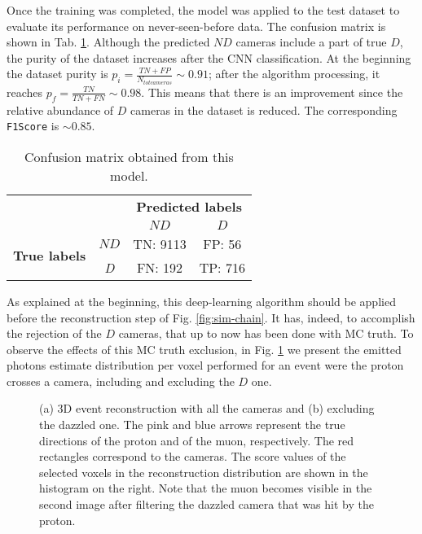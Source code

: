 Once the training was completed, the model was applied to the test dataset to evaluate its performance on never-seen-before data. The confusion matrix is shown in Tab. \ref{tab:conf-matrix}. Although the predicted $ND$ cameras include a part of true $D$, the purity of the dataset increases after the CNN classification. At the beginning the dataset purity is $p_i = \frac{TN + FP}{N_{tot cameras}} \sim 0.91$; after the algorithm processing, it reaches $p_f = \frac{TN}{TN+FN} \sim 0.98$. This means that there is an improvement since the relative abundance of $D$ cameras in the dataset is reduced. The corresponding \texttt{F1Score} is $\sim 0.85$.

\begin{table}[h!]
    \centering
    \begin{tabular}{cc|cc|}
    \cline{3-4}
    &   & \multicolumn{2}{c|}{\textbf{Predicted labels}} \\ %
    &   & \multicolumn{1}{c|}{\small{$ND$}}       & \small{$D$}  \\ \hline
    \multicolumn{1}{|c}{\multirow{2}{*}{\textbf{True labels}}} & \small{$ND$} & \multicolumn{1}{c|}{TN: 9113} & FP: 56 \\ 
    \cline{2-4} 
    \multicolumn{1}{|c}{} & \textit{\small{D}} & \multicolumn{1}{c|}{FN: 192} & TP: 716\\ 
    \hline
    \end{tabular}
    \caption{Confusion matrix obtained from this model.}
    \label{tab:conf-matrix}
\end{table}

As explained at the beginning, this deep-learning algorithm should be applied before the reconstruction step of Fig. \ref{fig:sim-chain}. It has, indeed, to accomplish the rejection of the $D$ cameras, that up to now has been done with MC truth. To observe the effects of this MC truth exclusion, in Fig. \ref{fig:ev-comparison} we present the emitted photons estimate distribution per voxel performed for an event were the proton crosses a camera, including and excluding the $D$ one.

\begin{figure}[h!]
    \centering
    \caption{(a) 3D event reconstruction with all the cameras and (b) excluding the dazzled one. The pink and blue arrows represent the true directions of the proton and of the muon, respectively. The red rectangles correspond to the cameras. The score values of the selected voxels in the reconstruction distribution are shown in the histogram on the right. Note that the muon becomes visible in the second image after filtering the dazzled camera that was hit by the proton.}
    \label{fig:ev-comparison}
\end{figure}

